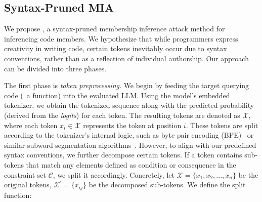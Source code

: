 




\subsection{Syntax-Pruned MIA}

We propose \tool, a syntax-pruned membership inference attack method for inferencing code members. We hypothesize that while programmers express creativity in writing code, certain tokens inevitably occur due to syntax conventions, rather than as a reflection of individual authorship. Our approach can be divided into three phases. 

The first phase is \textit{token preprocessing}. We begin by feeding the target querying code (\eg~a function) into the evaluated LLM. Using the model's embedded tokenizer, we obtain the tokenized sequence along with the predicted probability (derived from the \textit{logits}) for each token. The resulting tokens are denoted as $\mathcal{X}$, where each token $x_i \in \mathcal{X}$ represents the token at position $i$. These tokens are split according to the tokenizer's internal logic, such as byte pair encoding (BPE)~\cite{shibata1999byte} or similar subword segmentation algorithms~\cite{li2021char}. However, to align with our predefined syntax conventions, we further decompose certain tokens. If a token contains sub-tokens that match any elements defined as $\text{condition}$ or $\text{consequence}$ in the constraint set $\mathcal{C}$, we split it accordingly. Concretely, let $\mathcal{X} = \{ x_1, x_2, ..., x_n \}$ be the original tokens, $\mathcal{X}^{\prime} = \{ x_{ij}\}$ be the decomposed sub-tokens. We define the split function:

